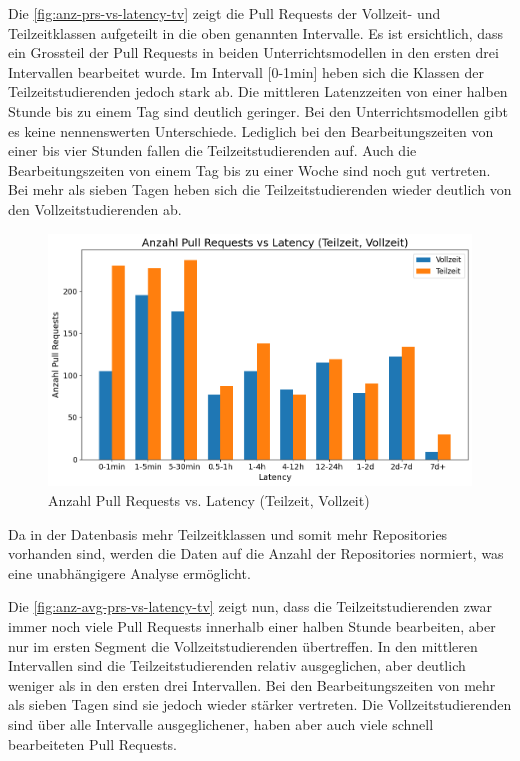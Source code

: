 Die \autoref{fig:anz-prs-vs-latency-tv} zeigt die Pull Requests der Vollzeit- und Teilzeitklassen aufgeteilt in die oben genannten Intervalle. Es ist ersichtlich, dass ein Grossteil der Pull Requests in beiden Unterrichtsmodellen in den ersten drei Intervallen bearbeitet wurde. Im Intervall [0-1min] heben sich die Klassen der Teilzeitstudierenden jedoch stark ab. 
Die mittleren Latenzzeiten von einer halben Stunde bis zu einem Tag sind deutlich geringer. Bei den Unterrichtsmodellen gibt es keine nennenswerten Unterschiede. Lediglich bei den Bearbeitungszeiten von einer bis vier Stunden fallen die Teilzeitstudierenden auf. Auch die Bearbeitungszeiten von einem Tag bis zu einer Woche sind noch gut vertreten. Bei mehr als sieben Tagen heben sich die Teilzeitstudierenden wieder deutlich von den Vollzeitstudierenden ab.

\begin{figure}[htbp]
    \includegraphics[width=\textwidth]{Figures/anz-prs-vs-latency-tv.png}
    \caption{Anzahl Pull Requests vs. Latency (Teilzeit, Vollzeit)}
    \label{fig:anz-prs-vs-latency-tv}
\end{figure}

Da in der Datenbasis mehr Teilzeitklassen und somit mehr Repositories vorhanden sind, werden die Daten auf die Anzahl der Repositories normiert, was eine unabhängigere Analyse ermöglicht.

Die \autoref{fig:anz-avg-prs-vs-latency-tv} zeigt nun, dass die Teilzeitstudierenden zwar immer noch viele Pull Requests innerhalb einer halben Stunde bearbeiten, aber nur im ersten Segment die Vollzeitstudierenden übertreffen. In den mittleren Intervallen sind die Teilzeitstudierenden relativ ausgeglichen, aber deutlich weniger als in den ersten drei Intervallen. Bei den Bearbeitungszeiten von mehr als sieben Tagen sind sie jedoch wieder stärker vertreten. Die Vollzeitstudierenden sind über alle Intervalle ausgeglichener, haben aber auch viele schnell bearbeiteten Pull Requests.


